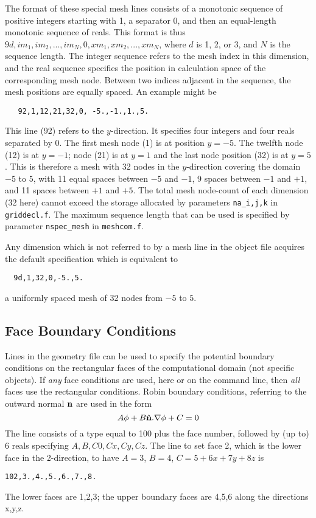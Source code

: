 \documentclass[12pt]{article}
\begin{document}
The format of these special mesh lines consists of a monotonic
sequence of positive integers starting with 1, a separator 0, and then
an equal-length monotonic sequence of reals. This format is thus
$9d,im_1,im_2,...,im_N,0,xm_1,xm_2,...,xm_N$, where $d$ is 1, 2, or 3,
and $N$ is the sequence length. The integer sequence refers to the
mesh index in this dimension, and the real sequence specifies the
position in calculation space of the corresponding mesh node. Between
two indices adjacent in the sequence, the mesh positions are equally
spaced. An example might be
\begin{verbatim}
   92,1,12,21,32,0, -5.,-1.,1.,5.
\end{verbatim}
This line (92) refers to the $y$-direction. It specifies four integers
and four reals separated by 0. The first mesh node (1) is at position
$y=-5$. The twelfth node (12) is at $y=-1$; node (21) is at $y=1$ and the
last node position (32) is at $y=5$. This is therefore a mesh with 32
nodes in the $y$-direction covering the domain $-5$ to $5$, with 11
equal spaces between $-5$ and $-1$, 9 spaces between $-1$ and $+1$,
and 11 spaces between $+1$ and $+5$. The total mesh node-count of each
dimension (32 here) cannot exceed the storage allocated by parameters
\verb!na_i,j,k! in \verb!griddecl.f!. The maximum sequence length that
can be used is specified by parameter \verb!nspec_mesh! in
\verb!meshcom.f!.

Any dimension which is not referred to by a mesh line in the object
file acquires the default specification which is equivalent to
\begin{verbatim}
  9d,1,32,0,-5.,5.
\end{verbatim}
a uniformly spaced mesh of 32 nodes from $-5$ to $5$.

\subsection{Face Boundary Conditions}

Lines in the geometry file can be used to specify the potential
boundary conditions on the rectangular faces of the computational
domain (not specific objects). If \emph{any} face conditions are used,
here or on the command line, then \emph{all} faces use the rectangular
conditions.  Robin boundary conditions, referring to the outward
normal ${\bf n}$ are used in the form
$$A\phi + B \hat{\bf n}.\nabla\phi + C =0$$
The line consists of a type equal to 100 plus the face number,
followed by (up to) 6 reals specifying $A,B,C0,Cx,Cy,Cz$.
The line to set face 2, which is the lower face in the 2-direction, to
have $A=3$, $B=4$, $C=5+6x+7y+8z$ is
\begin{verbatim}
102,3.,4.,5.,6.,7.,8.
\end{verbatim}
The lower faces are 1,2,3; the upper boundary faces are 4,5,6 along
the directions x,y,z.
\end{document}
